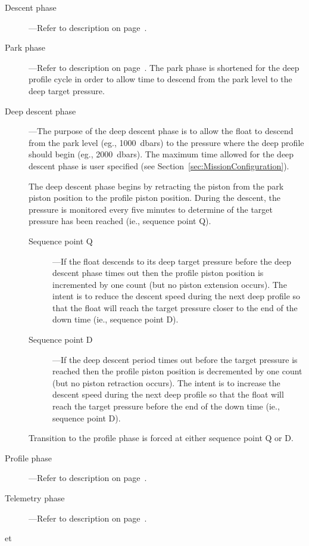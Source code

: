 \begin{description}

\item[Descent phase]---Refer to description on page~\pageref{DescentPhase}.

\item[Park phase]---Refer to description on page~\pageref{ParkPhase}.  The
  park phase is shortened for the deep profile cycle in order to allow time
  to descend from the park level to the deep target pressure.

\item[Deep descent phase]---The purpose of the deep descent phase is to
  allow the float to descend from the park level (eg., 1000~dbars) to the
  pressure where the deep profile should begin (eg., 2000~dbars).  The
  maximum time allowed for the deep descent phase is user specified (see
  Section~\ref{sec:MissionConfiguration}).

  The deep descent phase begins by retracting the piston from the park
  piston position to the profile piston position.  During the descent, the
  pressure is monitored every five minutes to determine of the target
  pressure has been reached (ie., sequence point Q).

  \begin{description}

  \item[Sequence point Q]---If the float descends to its deep target
    pressure before the deep descent phase times out then the profile piston
    position is incremented by one count (but no piston extension occurs).
    The intent is to reduce the descent speed during the next deep profile
    so that the float will reach the target pressure closer to the end of
    the down time (ie., sequence point D).

  \item[Sequence point D]---If the deep descent period times out before the
    target pressure is reached then the profile piston position is
    decremented by one count (but no piston retraction occurs).  The intent
    is to increase the descent speed during the next deep profile so that
    the float will reach the target pressure before the end of the down time
    (ie., sequence point D).

  \end{description}

  Transition to the profile phase is forced at either sequence point Q or D.

\item[Profile phase]---Refer to description on page~\pageref{ProfilePhase}.

\item[Telemetry phase]---Refer to description on page~\pageref{TelemetryPhase}.


\end{description}


et
